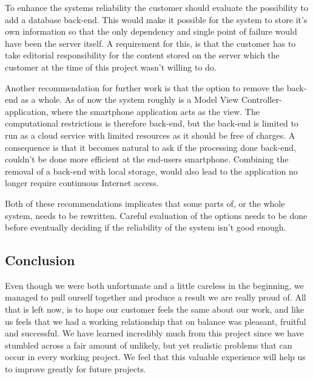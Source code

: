 To enhance the systems reliability the customer should evaluate the possibility to add a database back-end. This would make it possible for the system to store it's own information so that the only dependency and single point of failure would have been the server itself. A requirement for this, is that the customer has to take editorial responsibility for the content stored on the server which the customer at the time of this project wasn't willing to do.

Another recommendation for further work is that the option to remove the back-end as a whole. As of now the system roughly is a Model View Controller-application, where the smartphone application acts as the view. The computational restrictions is therefore back-end, but the back-end is limited to run as a cloud service with limited resources as it should be free of charges. A consequence is that it becomes natural to ask if the processing done back-end, couldn't be done more efficient at the end-users smartphone. Combining the removal of a back-end with local storage, would also lead to the application no longer require continuous Internet access.

Both of these recommendations implicates that some parts of, or the whole system, needs to be rewritten. Careful evaluation of the options needs to be done before eventually deciding if the reliability of the system isn't good enough.

\subsection{Conclusion}

Even though we were both unfortunate and a little careless in the beginning, we managed to pull ourself together and produce a result we are really proud of. All that is left now, is to hope our customer feels the same about our work, and like us feels that we had a working relationship that on balance was pleasant, fruitful and successful. We have learned incredibly much from this project since we have stumbled across a fair amount of unlikely, but yet realistic problems that can occur in every working project. We feel that this valuable experience will help us to improve greatly for future projects.
